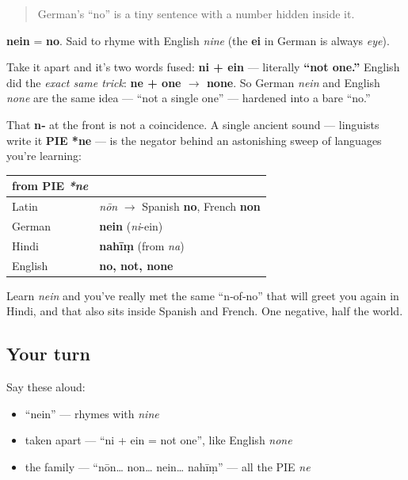 \begin{quote}
German's \textquotedblleft{}no\textquotedblright{} is a tiny sentence with a number hidden inside it.
\end{quote}

\begin{cousinweb}
\textbf{nein} = \textbf{no}. Said to rhyme with English \emph{nine} (the \textbf{ei} in German is always \emph{eye}).

Take it apart and it's two words fused: \textbf{ni + ein} — literally \textbf{\textquotedblleft{}not one.\textquotedblright{}} English did the \emph{exact same trick}: \textbf{ne + one $\to$ none}. So German \emph{nein} and English \emph{none} are the same idea — \textquotedblleft{}not a single one\textquotedblright{} — hardened into a bare \textquotedblleft{}no.\textquotedblright{}
\end{cousinweb}

\begin{culture}
That \textbf{n‑} at the front is not a coincidence. A single ancient sound — linguists write it \textbf{PIE *ne} — is the negator behind an astonishing sweep of languages you're learning:

\noindent
\begin{tabularx}{\linewidth}{@{}>{\raggedright\arraybackslash}X>{\raggedright\arraybackslash}X@{}}
\toprule
\textbf{from PIE \emph{*ne}} & \textbf{} \\
\midrule
Latin & \emph{nōn} $\to$ Spanish \textbf{no}, French \textbf{non} \\
German & \textbf{nein} (\emph{ni}-ein) \\
Hindi & \textbf{nahīṃ} (from \emph{na}) \\
English & \textbf{no, not, none} \\
\bottomrule
\end{tabularx}

Learn \emph{nein} and you've really met the same \textquotedblleft{}n‑of‑no\textquotedblright{} that will greet you again in Hindi, and that also sits inside Spanish and French. One negative, half the world.
\end{culture}

\subsection*{Your turn}
Say these aloud:

\begin{itemize}
\raggedright
  \item \textquotedblleft{}nein\textquotedblright{} — rhymes with \emph{nine}
  \item taken apart — \textquotedblleft{}ni + ein = not one\textquotedblright{}, like English \emph{none}
  \item the family — \textquotedblleft{}nōn… non… nein… nahīṃ\textquotedblright{} — all the PIE \emph{ne}
\end{itemize}

